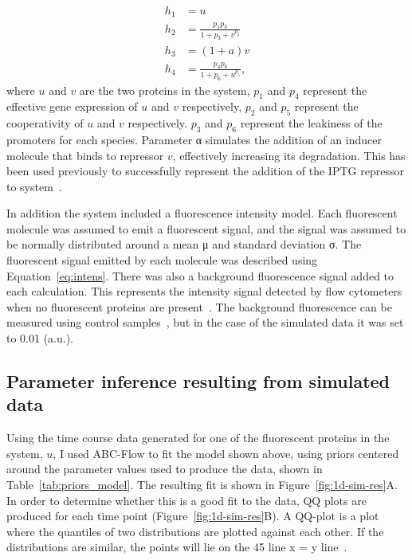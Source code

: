 \begin{align}
h_1 &= u \label{eq:eg1}\\
h_2 &= \frac{p_1  p_3	}{1+p_3+v^{p_2}} \label{eq:eg2}\\
h_3 &= (1 + a) v \label{eq:eg3}\\
h_4 &= \frac{p_4 p_6}{1+p_6+u^{p_5}} \label{eq:eg4},
\end{align}
where $u$ and $v$ are the two proteins in the system, $p_1$ and $p_4$ represent the effective gene expression of $u$ and $v$ respectively, $p_2$ and $p_5$ represent the cooperativity of $u$ and $v$ respectively. $p_3$ and $p_6$ represent the leakiness of the promoters for each species. Parameter α simulates the addition of an inducer molecule that binds to repressor $v$, effectively increasing its degradation. This has been used previously to successfully represent the addition of the IPTG repressor to system~\autocite{Lillacci:2013hu}.

In addition the system included a fluorescence intensity model. Each fluorescent molecule was assumed to emit a fluorescent signal, and the signal was assumed to be normally distributed around a mean μ and standard deviation σ. The fluorescent signal emitted by each molecule was described using Equation~\ref{eq:intens}. There was also a background fluorescence signal added to each calculation. This represents the intensity signal detected by flow cytometers when no fluorescent proteins are present~\autocite{Lillacci:2013hu}. The background fluorescence can be measured using control samples~\autocite{Lillacci:2013hu}, but in the case of the simulated data it was set to 0.01 (a.u.).  

\subsection{Parameter inference resulting from simulated data}
Using the time course data generated for one of the fluorescent proteins in the system, $u$, I used ABC-Flow to fit the model shown above, using priors centered around the parameter values used to produce the data, shown in Table~\ref{tab:priors_model}. The resulting fit is shown in Figure~\ref{fig:1d-sim-res}A. In order to determine whether this is a good fit to the data, QQ plots are produced for each time point (Figure~\ref{fig:1d-sim-res}B). A QQ-plot is a plot where the quantiles of two distributions are plotted against each other. If the distributions are similar, the points will lie on the 45\textdegree{} line x = y line~\autocite{Wilk:1968ts}. 

